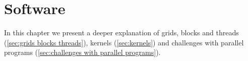 \chapter{Software}
\label{chap:software}

In this chapter we present a deeper explanation of grids, blocks and threads (\cref{sec:grids blocks threads}), kernels (\cref{sec:kernels}) and challenges with parallel programs (\cref{sec:challenges with parallel programs}).




